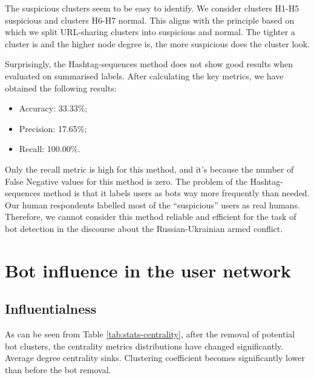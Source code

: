 The suspicious clusters seem to be easy to identify. We consider clusters H1-H5 suspicious and clusters H6-H7 normal. This aligns with the principle based on which we split URL-sharing clusters into suspicious and normal. The tighter a cluster is and the higher node degree is, the more suspicious does the cluster look. 

Surprisingly, the Hashtag-sequences method does not show good results when evaluated on summarised labels. After calculating the key metrics, we have obtained the following results:

\begin{itemize}
    \item Accuracy: 33.33\%;
    \item Precision: 17.65\%;
    \item Recall: 100.00\%.
\end{itemize}

Only the recall metric is high for this method, and it's because the number of False Negative values for this method is zero. The problem of the Hashtag-sequences method is that it labels users as bots way more frequently than needed. Our human respondents labelled most of the ``suspicious'' users as real humans. Therefore, we cannot consider this method reliable and efficient for the task of bot detection in the discourse about the Russian-Ukrainian armed conflict.

\section{Bot influence in the user network}

\subsection{Influentialness}
As can be seen from Table \ref{tab:stats-centrality}, after the removal of potential bot clusters, the centrality metrics distributions have changed significantly. Average degree centrality sinks. Clustering coefficient becomes significantly lower than before the bot removal. 

